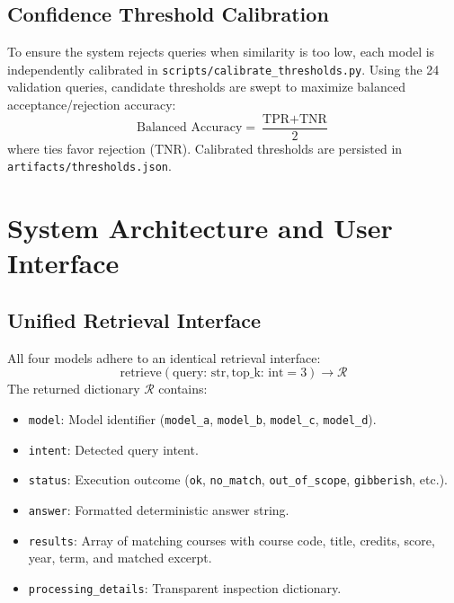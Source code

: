 \documentclass[12pt,a4paper]{report}
\begin{document}
\section{Confidence Threshold Calibration}
To ensure the system rejects queries when similarity is too low, each model is independently calibrated in \texttt{scripts/calibrate\_thresholds.py}. Using the 24 validation queries, candidate thresholds are swept to maximize balanced acceptance/rejection accuracy:
\begin{equation}
    \text{Balanced Accuracy} = \frac{\text{TPR} + \text{TNR}}{2}
\end{equation}
where ties favor rejection ($\text{TNR}$). Calibrated thresholds are persisted in \texttt{artifacts/thresholds.json}.

\chapter{System Architecture and User Interface}

\section{Unified Retrieval Interface}
All four models adhere to an identical retrieval interface:
\begin{equation}
    \text{retrieve}(\text{query: str}, \text{top\_k: int} = 3) \longrightarrow \mathcal{R}
\end{equation}
The returned dictionary $\mathcal{R}$ contains:
\begin{itemize}
    \item \texttt{model}: Model identifier (\texttt{model\_a}, \texttt{model\_b}, \texttt{model\_c}, \texttt{model\_d}).
    \item \texttt{intent}: Detected query intent.
    \item \texttt{status}: Execution outcome (\texttt{ok}, \texttt{no\_match}, \texttt{out\_of\_scope}, \texttt{gibberish}, etc.).
    \item \texttt{answer}: Formatted deterministic answer string.
    \item \texttt{results}: Array of matching courses with course code, title, credits, score, year, term, and matched excerpt.
    \item \texttt{processing\_details}: Transparent inspection dictionary.
\end{itemize}
\end{document}

